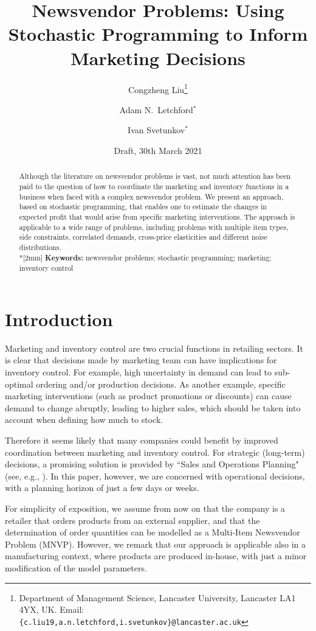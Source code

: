 \documentclass[a4paper,11pt]{article}
\title{Newsvendor Problems: Using Stochastic Programming to Inform Marketing Decisions}
\author{Congzheng Liu\thanks{Department of Management Science,
Lancaster University, Lancaster LA1 4YX, UK.
Email: {\tt \{c.liu19,a.n.letchford,i.svetunkov\}@lancaster.ac.uk}}
\and Adam N.\ Letchford$^*$ \and Ivan Svetunkov$^*$} %
\date{Draft, 30th March 2021}
\begin{document}
\maketitle

\begin{abstract}
Although the literature on newsvendor problems is vast, not much attention has been paid to the question of how to coordinate the marketing and inventory functions in a business when faced with a complex newsvendor problem. We present an approach, based on stochastic programming, that enables one to estimate the changes in expected profit that would arise from specific marketing interventions. The approach is applicable to a wide range of problems, including problems with multiple item types, side constraints, correlated demands, cross-price elasticities and different noise distributions.
\\*[2mm]
{\bf Keywords:} newsvendor problems; stochastic programming; marketing; inventory control 
\end{abstract}

\section{Introduction}

Marketing and inventory control are two crucial functions in retailing sectors. It is clear that decisions made by marketing team can have implications for inventory control. For example, high uncertainty in demand can lead to sub-optimal ordering and/or production decisions. As another example, specific marketing interventions (such as product promotions or discounts) can cause demand to change abruptly, leading to higher sales, which should be taken into account when defining how much to stock.

Therefore it seems likely that many companies could benefit by improved coordination between marketing and inventory control. For strategic (long-term) decisions, a promising solution is provided by ``Sales and Operations Planning" (see, e.g., \cite{KS14,Th12}). In this paper, however, we are concerned with operational decisions, with a planning horizon of just a few days or weeks.

For simplicity of exposition, we assume from now on that the company is a retailer that orders products from an external supplier, and that the determination of order quantities can be modelled as a Multi-Item Newsvendor Problem (MNVP). However, we remark that our approach is applicable also in a manufacturing context, where products are produced in-house, with just a minor modification of the model parameters.
\end{document}
